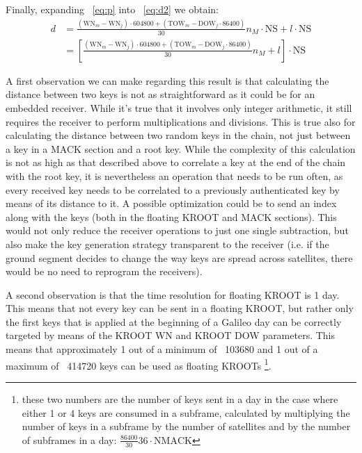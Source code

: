 Finally, expanding ~\ref{eq:p} into ~\ref{eq:d2} we obtain:
\begin{equation}
  \begin{aligned}
    d &= \frac{(\textrm{WN}_m - \textrm{WN}_j) \cdot 604800 + (\textrm{TOW}_m -
    \textrm{DOW}_j \cdot 86400)}{30} n_M \cdot \textrm{NS} + l \cdot \textrm{NS} \\
    &= \left[\frac{(\textrm{WN}_m - \textrm{WN}_j) \cdot 604800 + (\textrm{TOW}_m -
    \textrm{DOW}_j \cdot 86400)}{30} n_M  + l\right] \cdot \textrm{NS}
  \end{aligned}
\end{equation}

A first observation we can make regarding this result is that calculating the
distance between two keys is not as straightforward as it could be for an
embedded receiver. While it's true that it involves only integer arithmetic, it
still requires the receiver to perform multiplications and divisions. This is
true also for calculating the distance between two random keys in the chain, not
just between a key in a MACK section and a root key. While the complexity of
this calculation is not as high as that described above to correlate a key at
the end of the chain with the root key, it is nevertheless an operation that
needs to be run often, as every received key needs to be correlated to a
previously authenticated key by means of its distance to it. A possible
optimization could be to send an index along with the keys (both in the floating
KROOT and MACK sections). This would not only reduce the receiver operations to
just one single subtraction, but also make the key generation strategy
transparent to the receiver (i.e. if the ground segment decides to change the
way keys are spread across satellites, there would be no need to reprogram the
receivers).

A second observation is that the time resolution for floating KROOT is 1
day. This means that not every key can be sent in a floating KROOT, but rather
only the first keys that is applied at the beginning of a Galileo day can be
correctly targeted by means of the KROOT WN and KROOT DOW parameters. This means
that approximately 1 out of a minimum of ~103680 and 1 out of a maximum of
~414720 keys can be used as floating KROOTs \footnote{these two numbers are the number of
keys sent in a day in the case where either 1 or 4 keys are consumed in a
subframe, calculated by multiplying the number of keys in a subframe by the
number of satellites and by the number of subframes in a day:
$\frac{86400}{30}36 \cdot \textrm{NMACK}$}.

